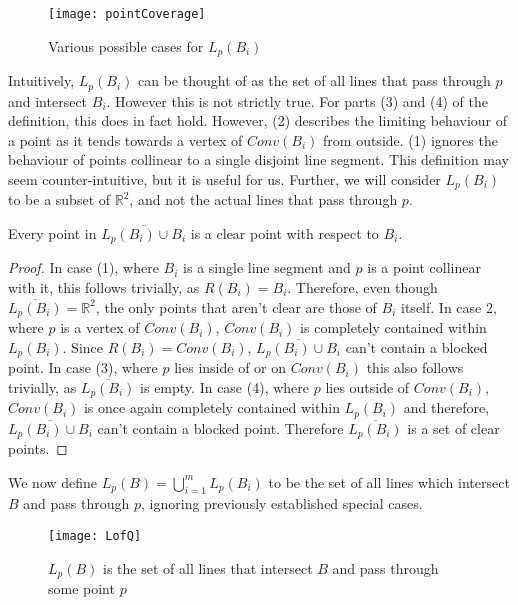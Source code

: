 \documentclass{cccg12}
\begin{document}
\begin{figure}[ht]
  \centering
  \texttt{[image: pointCoverage]}
  \caption{Various possible cases for $L_p(B_i)$}
  \label{fig:pointCoverage}
\end{figure}

Intuitively, $L_p(B_i)$ can be thought of as the set of all lines that pass through $p$ and intersect $B_i$. However this is not strictly true. For parts (3) and (4) of the definition, this does in fact hold. However, (2) describes the limiting behaviour of a point as it tends towards a vertex of $Conv(B_i)$ from outside. (1) ignores the behaviour of points collinear to a single disjoint line segment. This definition may seem counter-intuitive, but it is useful for us. Further, we will consider $L_p(B_i)$ to be a subset of $\mathds{R}^2$, and not the actual lines that pass through $p$. 

\begin{lemma}
Every point in $\overline{L_p(B_i) \cup B_i}$ is a clear point with respect to $B_i$.
\end{lemma}

\begin{proof}
In case (1), where $B_i$ is a single line segment and $p$ is a point collinear with it, this follows trivially, as $R(B_i) = B_i$. Therefore, even though $\overline{L_p(B_i)} = \mathds{R}^2$, the only points that aren't clear are those of $B_i$ itself. 
In case 2, where $p$ is a vertex of $Conv(B_i)$, $Conv(B_i)$ is completely contained within $L_p(B_i)$. 
	Since $R(B_i) = Conv(B_i)$, $\overline{L_p(B_i) \cup B_i}$ can't 
	contain a blocked point. 
In case (3), where $p$ lies inside of or on $Conv(B_i)$ this also follows trivially, as $\overline{L_p(B_i)}$ is empty. 
In case (4), where $p$ lies outside of $Conv(B_i)$, $Conv(B_i)$ is once again completely contained within $L_p(B_i)$ and therefore, $\overline{L_p(B_i) \cup B_i}$ can't contain a blocked point. 
Therefore $\overline{L_p(B_i)}$ is a set of clear points.
\end{proof}

We now define $L_p(B) = \displaystyle\bigcup\limits_{i=1}^{m} L_p(B_i)$ to be the set of all lines which intersect $B$ and pass through $p$, ignoring previously established special cases.

\begin{figure}[ht]
  \centering
  \texttt{[image: LofQ]}
  \caption{$L_p(B)$ is the set of all lines that intersect $B$ and pass through some point $p$}
  \label{fig:LofQ}
\end{figure} 
\end{document}
